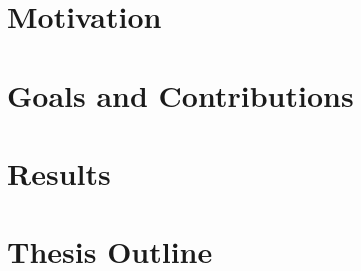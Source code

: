 
\section*{Motivation}
\label{sec:intro-motivation}

\section*{Goals and Contributions}
\label{sec:intro-goals}

\section*{Results}
\label{sec:intro-results}

\section*{Thesis Outline}
\label{sec:intro-outline}
